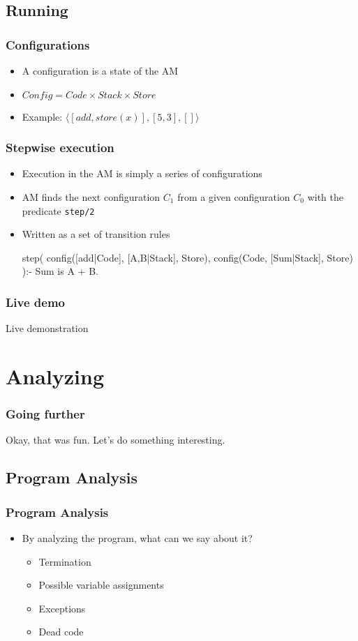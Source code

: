 \documentclass[]{beamer}
\begin{document}
\subsection{Running}
\begin{frame}[fragile]
\frametitle{Configurations}

\begin{itemize}
	\item A configuration is a state of the AM
	\item $Config = Code \times Stack \times Store$
	\item Example: $\langle [add, store(x)], [5, 3], []  \rangle$
\end{itemize}
\end{frame}

\begin{frame}[fragile]
\frametitle{Stepwise execution}
\begin{itemize}
	\item Execution in the AM is simply a series of configurations
	\item AM finds the next configuration $C_1$ from a given configuration $C_0$ with the predicate \verb|step/2|
	\item Written as a set of transition rules
\begin{boxedverbatim}
step(
	  config([add|Code], [A,B|Stack], Store), 
	  config(Code, [Sum|Stack], Store)
	):-
	Sum is A + B.
\end{boxedverbatim}
\end{itemize}
\end{frame}

\begin{frame}

\frametitle{Live demo}
\centering
Live demonstration
\end{frame}

\section{Analyzing}

\begin{frame}[fragile]
\frametitle{Going further}
\centering
Okay, that was fun. Let's do something interesting.
\end{frame}

\subsection{Program Analysis}

\begin{frame}
\frametitle{Program Analysis}
\begin{itemize}
	\item By analyzing the program, what can we say about it?
	\begin{itemize}
		\item Termination
		\item Possible variable assignments
		\item Exceptions
		\item Dead code
	\end{itemize}
\end{itemize}
\end{frame}
\end{document}
